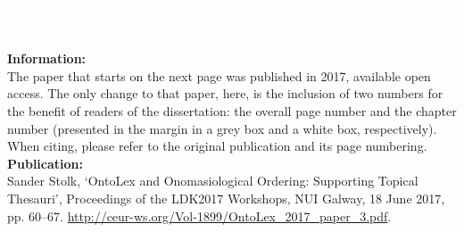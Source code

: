 \noindent{\color{white}\rule{\textwidth}{0.01em}}
\checkoddpage\ifoddpage\newpage\mbox{}\else\fi

\thispagestyle{empty}


\begin{center}
\setlength\fboxsep{1cm}
\noindent\colorbox{evokelightblue}{
\parbox[c][1.0in-2cm]{\textwidth-2cm}{\RaggedLeft\Huge \textbf{\textcolor{white}{Chapter 4}}}}
\end{center}

\noindent{\color{lightgray}\rule{\textwidth}{0.4em}}
\\[2em]
\noindent\textbf{Information:}\\
The paper that starts on the next page was published in 2017, available open access. The only change to that paper, here, is the inclusion of two numbers for the benefit of readers of the dissertation: the overall page number and the chapter number (presented in the margin in a grey box and a white box, respectively). When citing, please refer to the original publication and its page numbering.
\\[1em]
\noindent\textbf{Publication:}\\
    Sander Stolk, `OntoLex and Onomasiological Ordering: Supporting Topical Thesauri', Proceedings of the LDK2017 Workshops, NUI Galway, 18 June 2017, pp. 60–67. \url{http://ceur-ws.org/Vol-1899/OntoLex_2017_paper_3.pdf}.
\noindent
\\[1em]
\noindent{\color{lightgray}\rule{\textwidth}{0.4em}}
